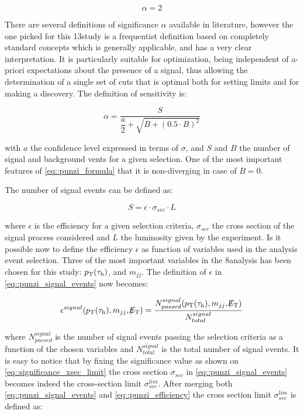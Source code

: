 \begin{equation}
\alpha = 2
\label{eq::significance_xsec_limit}
\end{equation}

There are several definitions of significance $\alpha$ available in literature, however the one picked for this 13\tev study is a frequentist definition based on completely standard concepts\cite{Punzi:2003bu} which is generally applicable, and has a very clear interpretation. It is particularly suitable for optimization, being independent of a-priori expectations about the presence of a signal, thus allowing the determination of a single set of cuts that is optimal both for setting limits and for making a discovery. The definition of sensitivity is:

\begin{equation}
\alpha = \dfrac{S}{\dfrac{a}{2} + \sqrt{B + (0.5 \cdot B)^{2}}}
\label{eq::punzi_formula}
\end{equation}

with $a$ the confidence level expressed in terms of $\sigma$, and $S$ and $B$ the number of signal and background vents for a given selection. One of the most important features of \autoref{eq::punzi_formula} that it is non-diverging in case of $B = 0$.

The number of signal events can be defined as:

\begin{equation}
S = \epsilon \cdot \sigma_{sec} \cdot L
\label{eq::punzi_signal_events}
\end{equation}

where $\epsilon$ is the efficiency for a given selection criteria, $\sigma_{sec}$ the cross section of the signal process considered and $L$ the luminosity given by the experiment. Is it possible now to define the efficiency $\epsilon$ as function of variables used in the analysis event selection. Three of the most important variables in the 8\tev analysis has been chosen for this study: $p_{\text{T}}(\tau_{\text{h}})$, \met and $m_{jj}$. The definition of $\epsilon$ in \autoref{eq::punzi_signal_events} now becomes:

\begin{equation}
\epsilon^{signal} ( p_{\text{T}}(\tau_{\text{h}}) , m_{jj} ,  \slash\mkern-12mu{E}_{\text{T}} ) = \dfrac{N^{signal}_{passed}(p_{\text{T}}(\tau_{\text{h}}) , m_{jj} ,  \slash\mkern-12mu{E}_{\text{T}})}{N^{signal}_{total}}
\label{eq::punzi_efficiency}
\end{equation}

where $N^{signal}_{passed}$ is the number of signal events passing the selection criteria as a function of the chosen variables and $N^{signal}_{total}$ is the total number of signal events. It is easy to notice that by fixing the significance value as shown on \autoref{eq::significance_xsec_limit} the cross section $\sigma_{sec}$ in \autoref{eq::punzi_signal_events} becomes indeed the cross-section limit $\sigma^{lim}_{sec}$. After merging both \autoref{eq::punzi_signal_events} and \autoref{eq::punzi_efficiency} the cross section limit $\sigma^{lim}_{sec}$ is defined as:
	

